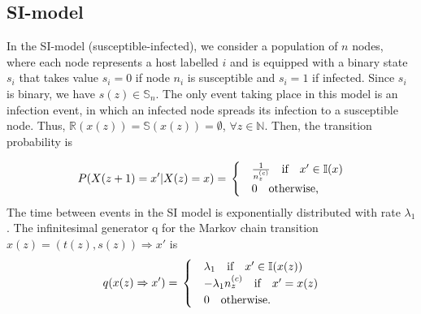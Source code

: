 \documentclass[12pt]{article} %
\numberwithin{equation}{section}
\begin{document}
\subsection{SI-model}\label{si-model-section}
In the SI-model (susceptible-infected), we consider a population of $n$ nodes, where each node represents a host labelled $i$ and is equipped with a binary state $s_i$ that takes value $s_i = 0$ if node $n_i$ is susceptible and $s_i = 1$ if infected. Since $s_i$ is binary, we have $s(z) \in \mathbb{S}_n$. The only event taking place in this model is an infection event, in which an infected node spreads its infection to a susceptible node. Thus, $\mathbb{R}(x(z))=\mathbb{S}(x(z)) = \emptyset$, $\forall z\in \mathbb{N}$.
Then, the transition probability is 

\begin{equation} \label{firstP}
P(X(z+1) = x' |X(z)= x) = \\
\begin{cases}
& \frac{1}{n_z^{(c)}}  \quad \text{if} \quad x' \in \mathbb{I}(x) \\
& 0 \quad \text{otherwise,}
\end{cases}
\end{equation}
The time between events in the SI model is exponentially distributed with rate $\lambda_1$. The infinitesimal generator q for the Markov chain transition $x(z) = (t(z),s(z)) \Rightarrow x'$ is
\begin{equation}\label{trans1}
q(x(z) \Rightarrow x') = \\
\begin{cases}
& \lambda_1   \quad \text{if} \quad x' \in \mathbb{I}(x(z)) \\ 
& -\lambda_1 n_z^{(c)} \quad \text{if} \quad x' = x(z)\\
& 0 \quad \text{otherwise.}
\end{cases}
\end{equation}
\end{document}
